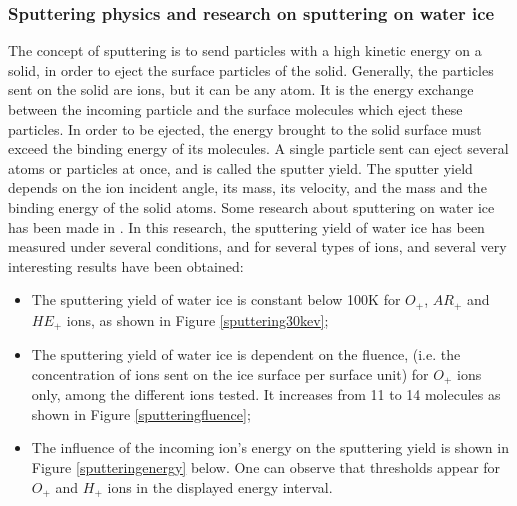 
\subsubsection{Sputtering physics and research on sputtering on water ice}

The concept of sputtering is to send particles with a high kinetic energy on a solid, in order to eject the surface particles of the solid. Generally, the particles sent on the solid are ions, but it can be any atom. It is the energy exchange between the incoming particle and the surface molecules which eject these particles. In order to be ejected, the energy brought to the solid surface must exceed the binding energy of its molecules. A single particle sent can eject several atoms or particles at once, and is called the sputter yield. The sputter yield depends on the ion incident angle, its mass, its velocity, and the mass and the binding energy of the solid atoms. Some research about sputtering on water ice has been made in \cite{baragiola2003sputtering}.
In this research, the sputtering yield of water ice has been measured under several conditions, and for several types of ions, and several very interesting results have been obtained:

\begin{itemize}
    \item{The sputtering yield of water ice is constant below 100K for $O_{+}$, $AR_{+}$ and $HE_{+}$ ions, as shown in Figure \ref{sputtering30kev};}
    
    \item{The sputtering yield of water ice is dependent on the fluence, (i.e. the concentration of ions sent on the ice surface per surface unit) for $O_{+}$ ions only, among the different ions tested. It increases from 11 to 14 molecules as shown in Figure \ref{sputteringfluence};}

    \item{The influence of the incoming ion's energy on the sputtering yield is shown in Figure \ref{sputteringenergy} below. One can observe that thresholds appear for $O_{+}$ and $H_{+}$ ions in the displayed energy interval.}
    
\end{itemize}
    
